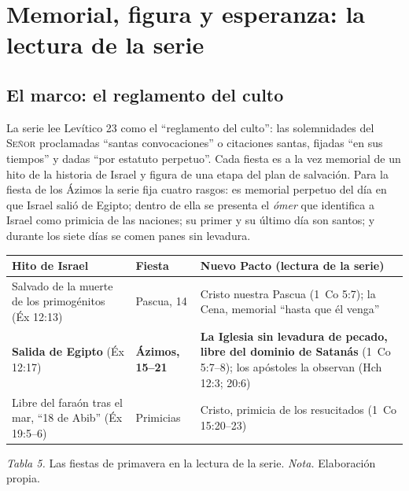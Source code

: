 \documentclass[11pt,letterpaper]{article}
\newcommand{\SENOR}{\textsc{Señor}}
\begin{document}
\section{Memorial, figura y esperanza: la lectura de la serie}

\subsection{El marco: el reglamento del culto}
La serie lee Levítico 23 como el ``reglamento del culto'': las solemnidades del \SENOR{} proclamadas ``santas convocaciones'' o citaciones santas, fijadas ``en sus tiempos'' y dadas ``por estatuto perpetuo''. Cada fiesta es a la vez memorial de un hito de la historia de Israel y figura de una etapa del plan de salvación. Para la fiesta de los Ázimos la serie fija cuatro rasgos: es memorial perpetuo del día en que Israel salió de Egipto; dentro de ella se presenta el \emph{ómer} que identifica a Israel como primicia de las naciones; su primer y su último día son santos; y durante los siete días se comen panes sin levadura.

\begin{center}\begin{minipage}{\linewidth}\centering\small\renewcommand{\arraystretch}{1.25}
\begin{tabular}{@{}L{4.6cm}L{2.6cm}L{8.4cm}@{}}
\toprule
\textbf{Hito de Israel} & \textbf{Fiesta} & \textbf{Nuevo Pacto (lectura de la serie)} \\ \midrule
Salvado de la muerte de los primogénitos (Éx 12:13) & Pascua, 14 & Cristo nuestra Pascua (1~Co 5:7); la Cena, memorial ``hasta que él venga'' \\
\textbf{Salida de Egipto} (Éx 12:17) & \textbf{Ázimos, 15--21} & \textbf{La Iglesia sin levadura de pecado, libre del dominio de Satanás} (1~Co 5:7--8); los apóstoles la observan (Hch 12:3; 20:6) \\
Libre del faraón tras el mar, ``18 de Abib'' (Éx 19:5--6) & Primicias & Cristo, primicia de los resucitados (1~Co 15:20--23) \\
\bottomrule
\end{tabular}\par\nopagebreak
{\footnotesize\color{sepia}\textit{Tabla 5.} Las fiestas de primavera en la lectura de la serie. \textit{Nota.} Elaboración propia.}
\end{minipage}\end{center}
\end{document}
